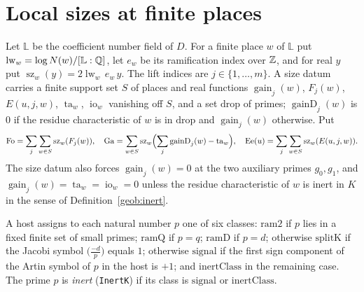 \section{Local sizes at finite places}

\begin{definition}\label{geob:sz}
Let $\mathbb L$ be the coefficient number field of $D$. For a finite place $w$
of $\mathbb L$ put $\operatorname{lw}_w=\log N(w)/[\mathbb L:\mathbb{Q}]$, let $e_w$ be
its ramification index over $\mathbb{Z}$, and for real $y$ put
$\operatorname{sz}_w(y)=2\operatorname{lw}_w\,e_w\,y$. The lift indices are
$j\in\{1,\dots,m\}$. A size datum carries a finite support set $S$ of places
and real functions $\operatorname{gain}_j(w)$, $F_j(w)$, $E(u,j,w)$,
$\operatorname{ta}_w$, $\operatorname{io}_w$ vanishing off $S$, and a set
$\mathrm{drop}$ of primes; $\operatorname{gainD}_j(w)$ is $0$ if the residue
characteristic of $w$ is in $\mathrm{drop}$ and $\operatorname{gain}_j(w)$
otherwise. Put
\[
\mathrm{Fo}=\sum_j\sum_{w\in S}\operatorname{sz}_w(F_j(w)),\quad
\mathrm{Ga}=\sum_{w\in S}\operatorname{sz}_w\Bigl(\sum_j\operatorname{gainD}_j(w)-\operatorname{ta}_w\Bigr),\quad
\operatorname{Ee}(u)=\sum_j\sum_{w\in S}\operatorname{sz}_w(E(u,j,w)).
\]
The size datum also forces $\operatorname{gain}_j(w)=0$ at the two auxiliary
primes $g_0,g_1$, and $\operatorname{gain}_j(w)=\operatorname{ta}_w=\operatorname{io}_w=0$
unless the residue characteristic of $w$ is inert in $K$ in the sense of
Definition~\ref{geob:inert}.
\end{definition}

\begin{definition}\label{geob:inert}
A host assigns to each natural number $p$ one of six classes: $\mathrm{ram2}$
if $p$ lies in a fixed finite set of small primes; $\mathrm{ramQ}$ if $p=q$;
$\mathrm{ramD}$ if $p=d$; otherwise $\mathrm{splitK}$ if the Jacobi symbol
$\bigl(\frac{-d}{p}\bigr)$ equals $1$; otherwise $\mathrm{signal}$ if the first
sign component of the Artin symbol of $p$ in the host is $+1$; and
$\mathrm{inertClass}$ in the remaining case. The prime $p$ is \emph{inert}
(\texttt{InertK}) if its class is $\mathrm{signal}$ or $\mathrm{inertClass}$.
\end{definition}

